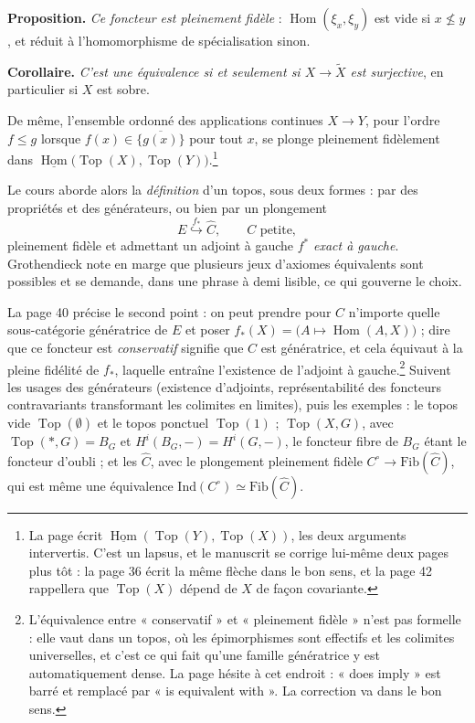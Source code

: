 \documentclass[11pt,a4paper]{article}
\begin{document}
\textbf{Proposition.} \emph{Ce foncteur est pleinement fidèle} :
$\operatorname{Hom}(\xi_{x}, \xi_{y})$ est vide si $x \not\leq y$, et réduit à
l'homomorphisme de spécialisation sinon.

\textbf{Corollaire.} \emph{C'est une équivalence si et seulement si
$X \to \widetilde{X}$ est surjective}, en particulier si $X$ est sobre.

De même, l'ensemble ordonné des applications continues $X \to Y$, pour l'ordre
$f \leq g$ lorsque $f(x) \in \overline{\{g(x)\}}$ pour tout $x$, se plonge
pleinement fidèlement dans $\underline{\operatorname{Hom}}\bigl(
\operatorname{Top}(X), \operatorname{Top}(Y)\bigr)$.\footnote{La page écrit
$\underline{\operatorname{Hom}}(\operatorname{Top}(Y), \operatorname{Top}(X))$,
les deux arguments intervertis. C'est un lapsus, et le manuscrit se corrige
lui-même deux pages plus tôt : la page 36 écrit la même flèche dans le bon
sens, et la page 42 rappellera que $\operatorname{Top}(X)$ dépend de $X$ de
façon covariante.}

Le cours aborde alors la \emph{définition} d'un topos, sous deux formes :
par des propriétés et des générateurs, ou bien par un plongement
\[
E \overset{f_{*}}{\hookrightarrow} \widehat{C},
\qquad C \text{ petite},
\]
pleinement fidèle et admettant un adjoint à gauche $f^{*}$ \emph{exact à
gauche}. Grothendieck note en marge que plusieurs jeux d'axiomes équivalents
sont possibles et se demande, dans une phrase à demi lisible, ce qui gouverne
le choix.

La page 40 précise le second point : on peut prendre pour $C$ n'importe quelle
sous-catégorie génératrice de $E$ et poser $f_{*}(X) = \bigl(A \mapsto
\operatorname{Hom}(A,X)\bigr)$ ; dire que ce foncteur est \emph{conservatif}
signifie que $C$ est génératrice, et cela équivaut à la pleine fidélité de
$f_{*}$, laquelle entraîne l'existence de l'adjoint à
gauche.\footnote{L'équivalence entre « conservatif » et « pleinement fidèle »
n'est pas formelle : elle vaut dans un topos, où les épimorphismes sont
effectifs et les colimites universelles, et c'est ce qui fait qu'une famille
génératrice y est automatiquement dense. La page hésite à cet endroit :
« does imply » est barré et remplacé par « is equivalent with ». La correction
va dans le bon sens.} Suivent les usages des générateurs (existence
d'adjoints, représentabilité des foncteurs contravariants transformant les
colimites en limites), puis les exemples : le topos vide
$\operatorname{Top}(\emptyset)$ et le topos ponctuel $\operatorname{Top}(1)$ ;
$\operatorname{Top}(X,G)$, avec $\operatorname{Top}(*,G) = B_{G}$ et
$H^{i}(B_{G}, -) = H^{i}(G,-)$, le foncteur fibre de $B_{G}$ étant le foncteur
d'oubli ; et les $\widehat{C}$, avec le plongement pleinement fidèle
$C^{\circ} \to \mathrm{Fib}(\widehat{C})$, qui est même une équivalence
$\mathrm{Ind}(C^{\circ}) \simeq \mathrm{Fib}(\widehat{C})$.
\end{document}
